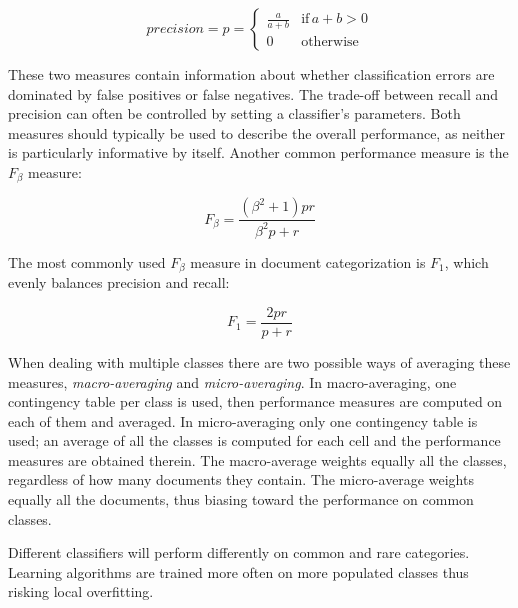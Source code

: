 \documentclass[a4paper,twocolumn]{article}
\begin{document}
\begin{displaymath}
precision = p = \left\{ \begin{array}{ll}
\frac{a}{a+b} & \textrm{if} \, a+b>0 \\
0                  & \textrm{otherwise}
\end{array} \right.
\end{displaymath}

These two measures contain information about whether classification errors are dominated by false positives or false negatives.  The trade-off between recall and precision can often be controlled by setting a classifier's parameters. Both measures should typically be used to describe the overall performance, as neither is particularly informative by itself. Another common performance measure is the $F_\beta$ measure:

\begin{displaymath}
F_\beta = \frac{(\beta^2 + 1)pr}{\beta^2 p + r}
\end{displaymath}

The most commonly used $F_\beta$ measure in document categorization is $F_1$, which evenly balances precision and recall:

\begin{displaymath}
F_1 = \frac{2pr}{p + r}
\end{displaymath}

When dealing with multiple classes there are two possible ways of averaging these measures, \emph{macro-averaging} and \emph{micro-averaging}. In macro-averaging, one contingency table per class is used, then performance measures are computed on each of them and averaged. In micro-averaging only one contingency table is used; an average of all the classes is computed for each cell and the performance measures are obtained therein. The macro-average weights equally all the classes, regardless of how many documents they contain. The micro-average weights equally all the documents, thus biasing toward the performance on common classes.

Different classifiers will perform differently on common and rare categories. Learning algorithms are trained more often on more populated classes thus risking local overfitting.
\end{document}
